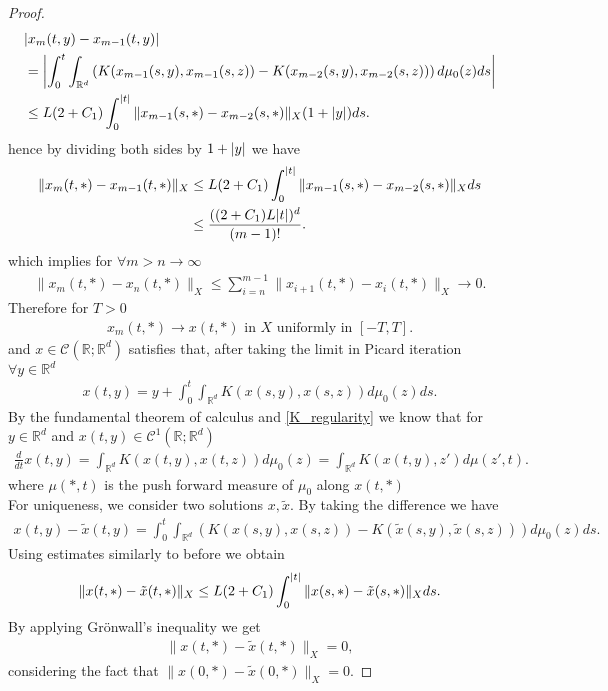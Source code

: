 \begin{proof}
  \begin{align*}
    &\abs{x_m(t,y) - x_{m-1}(t,y)} \\
    &= \abs*{\int_0^{t} \int_{\mathbb{R}^{d} }\left( K(x_{m-1}(s,y),x_{m-1}(s,z)) - K(x_{m-2}(s,y),x_{m-2}(s,z)) \right)d\mu_0(z)ds  }\\
    &\le L(2+C_{1})\int_0^{\abs{t}} \|x_{m-1}(s,*)-x_{m-2}(s,*)\|_X(1+\abs{y}) ds
  .\end{align*}
  hence by dividing both sides by $1 + \abs{y}$ we have 
  \begin{align*}
    \|x_m(t,*) - x_{m-1}(t,*)\|_X &\le L(2+C_{1})\int_0^{\abs{t}}  \|x_{m-1}(s,*) - x_{m-2}(s,*)\|_X ds\\
                                  &\le \frac{((2+C_{1})L \abs{t})^{d} }{(m-1)!}
  .\end{align*}
  which implies for $\forall m > n \to \infty$ 
  \begin{align*}
    \|x_m(t,*) - x_n(t,*)\|_X \le  \sum_{i=n}^{m-1} \|x_{i+1}(t,*) - x_i(t,*)\|_X \to  0
  .\end{align*}
  Therefore for $T > 0 $ 
  \begin{align*}
    x_m(t,*) \to x(t,*) \text{ in } X \text{ uniformly in } [-T,T]
  .\end{align*}
  and $x \in  \mathcal{C}(\mathbb{R};\mathbb{R}^{d}  )$ satisfies that, after taking the limit in Picard iteration $\forall y \in  \mathbb{R}^{d} $
  \begin{align*}
    x(t,y) = y + \int_0^{t} \int_{\mathbb{R}^{d} } K(x(s,y),x(s,z)) d\mu_0(z) ds
  .\end{align*}
  By the fundamental theorem of calculus and \autoref{K_regularity} we know that for $y \in  \mathbb{R}^{d} $ and $x(t,y) \in  \mathcal{C}^{1}(\mathbb{R};\mathbb{R}^{d} ) $
  \begin{align*}
    \frac{d}{dt} x(t,y) = \int_{\mathbb{R}^{d} } K(x(t,y),x(t,z)) d\mu_0(z) = \int_{\mathbb{R}^{d} }K(x(t,y),z')d\mu(z',t)
  .\end{align*}
  where $\mu(*,t)$ is the push forward measure of $\mu_0$ along $x(t,*)$\\[1ex]
  For uniqueness, we consider two solutions $x,\tilde{x} $. By taking the difference we have 
  \begin{align*}
    x(t,y) - \tilde{x}(t,y)  = \int_0^{t} \int_{\mathbb{R}^{d} } \left( K(x(s,y),x(s,z)) - K(\tilde{x}(s,y),\tilde{x}(s,z)  )\right)  d\mu_0(z)ds
  .\end{align*}
  Using estimates similarly to before  we obtain 
  \begin{align*}
    \|x(t,*)-\tilde{x}(t,*) \|_X \le L(2+C_{1})\int_0^{\abs{t}} \|x(s,*)-\tilde{x}(s,*) \|_X ds 
  .\end{align*}
  By applying Grönwall's inequality we get 
  \begin{align*}
    \|x(t,*) - \tilde{x}(t,*) \|_X = 0,
\end{align*}
considering the fact that $\|x(0,*) - \tilde{x}(0,*) \|_X = 0$.
\end{proof}
